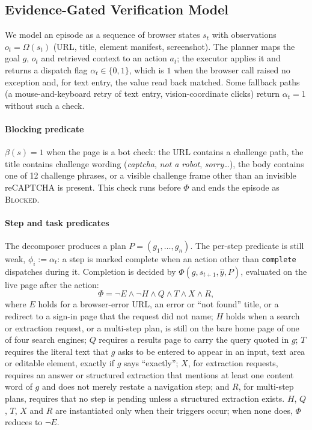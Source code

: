 \subsection{Evidence-Gated Verification Model}
\label{sec:formal}

We model an episode as a sequence of browser states $s_t$ with observations $o_t=\Omega(s_t)$ (URL, title, element manifest, screenshot). The planner maps the goal $g$, $o_t$ and retrieved context to an action $a_t$; the executor applies it and returns a dispatch flag $\alpha_t\in\{0,1\}$, which is $1$ when the browser call raised no exception and, for text entry, the value read back matched. Some fallback paths (a mouse-and-keyboard retry of text entry, vision-coordinate clicks) return $\alpha_t=1$ without such a check.

\paragraph{Blocking predicate} $\beta(s)=1$ when the page is a bot check: the URL contains a challenge path, the title contains challenge wording (\emph{captcha}, \emph{not a robot}, \emph{sorry\ldots}), the body contains one of 12 challenge phrases, or a visible challenge frame other than an invisible reCAPTCHA is present. This check runs before $\Phi$ and ends the episode as \textsc{Blocked}.

\paragraph{Step and task predicates} The decomposer produces a plan $P=(g_1,\dots,g_n)$. The per-step predicate is still weak, $\phi_i := \alpha_t$: a step is marked complete when an action other than \texttt{complete} dispatches during it. Completion is decided by $\Phi(g,s_{t+1},\hat{y},P)$, evaluated on the live page after the action:
\begin{equation}
\Phi = \neg E \wedge \neg H \wedge Q \wedge T \wedge X \wedge R,
\label{eq:phi}
\end{equation}
where $E$ holds for a browser-error URL, an error or ``not found'' title, or a redirect to a sign-in page that the request did not name; $H$ holds when a search or extraction request, or a multi-step plan, is still on the bare home page of one of four search engines; $Q$ requires a results page to carry the query quoted in $g$; $T$ requires the literal text that $g$ asks to be entered to appear in an input, text area or editable element, exactly if $g$ says ``exactly''; $X$, for extraction requests, requires an answer or structured extraction that mentions at least one content word of $g$ and does not merely restate a navigation step; and $R$, for multi-step plans, requires that no step is pending unless a structured extraction exists. $H$, $Q$, $T$, $X$ and $R$ are instantiated only when their triggers occur; when none does, $\Phi$ reduces to $\neg E$.

